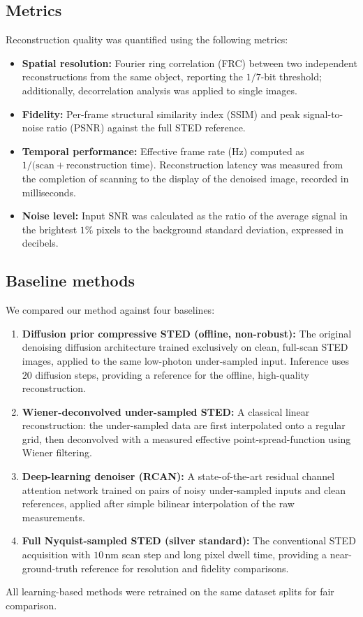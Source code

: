 \documentclass{article}
\begin{document}
\subsection{Metrics}
\label{subsec:metrics}
Reconstruction quality was quantified using the following metrics:
\begin{itemize}
    \item \textbf{Spatial resolution:} Fourier ring correlation (FRC) between two independent reconstructions from the same object, reporting the $1/7$-bit threshold; additionally, decorrelation analysis \cite{Decorr} was applied to single images.
    \item \textbf{Fidelity:} Per-frame structural similarity index (SSIM) and peak signal-to-noise ratio (PSNR) against the full STED reference.
    \item \textbf{Temporal performance:} Effective frame rate (Hz) computed as $1/(\mathrm{scan} + \mathrm{reconstruction}$ time). Reconstruction latency was measured from the completion of scanning to the display of the denoised image, recorded in milliseconds.
    \item \textbf{Noise level:} Input SNR was calculated as the ratio of the average signal in the brightest $1\%$ pixels to the background standard deviation, expressed in decibels.
\end{itemize}

\subsection{Baseline methods}
\label{subsec:baselines}
We compared our method against four baselines:
\begin{enumerate}
    \item[(a)] \textbf{Diffusion prior compressive STED (offline, non-robust):} The original denoising diffusion architecture trained exclusively on clean, full-scan STED images, applied to the same low-photon under-sampled input. Inference uses $20$ diffusion steps, providing a reference for the offline, high-quality reconstruction.
    \item[(b)] \textbf{Wiener-deconvolved under-sampled STED:} A classical linear reconstruction: the under-sampled data are first interpolated onto a regular grid, then deconvolved with a measured effective point-spread-function using Wiener filtering.
    \item[(c)] \textbf{Deep-learning denoiser (RCAN):} A state-of-the-art residual channel attention network \cite{RCAN} trained on pairs of noisy under-sampled inputs and clean references, applied after simple bilinear interpolation of the raw measurements.
    \item[(d)] \textbf{Full Nyquist-sampled STED (silver standard):} The conventional STED acquisition with $10\,\mathrm{nm}$ scan step and long pixel dwell time, providing a near-ground-truth reference for resolution and fidelity comparisons.
\end{enumerate}
All learning-based methods were retrained on the same dataset splits for fair comparison.
\end{document}
